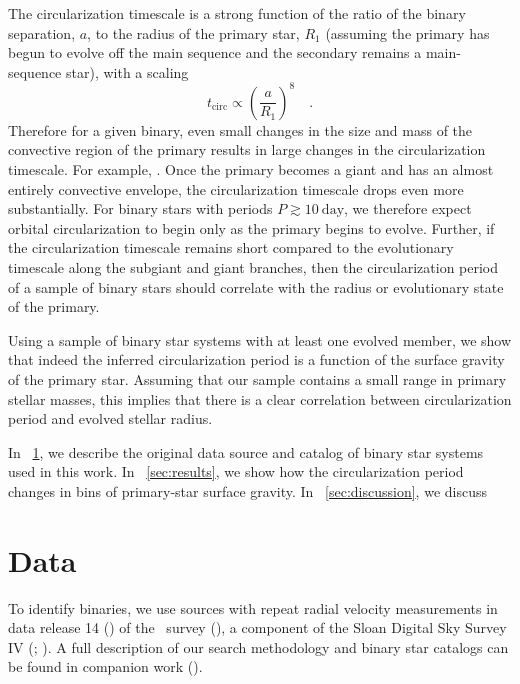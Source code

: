 \documentclass[modern, letterpaper]{aastex62}
\newcommand{\apogee}{\project{\acronym{APOGEE}}}
\newcommand{\sdssiv}{\project{\acronym{SDSS-IV}}}
\newcommand{\DR}{\acronym{DR14}}
\begin{document}
The circularization timescale is a strong function of the ratio of the binary
separation, $a$, to the radius of the primary star, $R_1$ (assuming the primary
has begun to evolve off the main sequence and the secondary remains a
main-sequence star), with a scaling
\begin{equation}
    t_\textrm{circ} \propto \left(\frac{a}{R_1}\right)^8 \quad .
\end{equation}
Therefore for a given binary, even small changes in the size and mass of the
convective region of the primary results in large changes in the circularization
timescale.
For example, .
Once the primary becomes a giant and has an almost entirely convective envelope,
the circularization timescale drops even more substantially.
For binary stars with periods $P \gtrsim 10~\textrm{day}$, we therefore expect
orbital circularization to begin only as the primary begins to evolve.
Further, if the circularization timescale remains short compared to the
evolutionary timescale along the subgiant and giant branches, then the
circularization period of a sample of binary stars should correlate with the
radius or evolutionary state of the primary.

Using a sample of binary star systems with at least one evolved member, we show
that indeed the inferred circularization period is a function of the surface
gravity of the primary star.
Assuming that our sample contains a small range in primary stellar masses, this
implies that there is a clear correlation between circularization period and
evolved stellar radius.

In \sectionname~\ref{sec:data}, we describe the original data source and catalog
of binary star systems used in this work.
In \sectionname~\ref{sec:results}, we show how the circularization period changes in bins of primary-star surface gravity.
In \sectionname~\ref{sec:discussion}, we discuss 

\section{Data} \label{sec:data}

To identify binaries, we use sources with repeat radial velocity measurements in
data release 14 (\DR) of the \apogee\ survey
(\citealt{Majewski:2017,Abolfathi:2017}), a component of the Sloan Digital Sky
Survey IV (\sdssiv; \citealt{Gunn:2006,Blanton:2017}).
A full description of our search methodology and binary star catalogs can be
found in companion work (\citealt{Price-Whelan:2018}).
\end{document}
